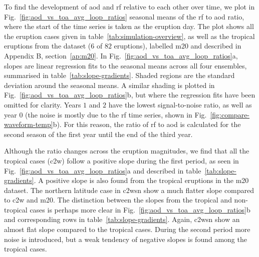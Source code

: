 \documentclass{ametsocV6.1}
\begin{document}
To find the development of \gls{aod} and \gls{rf} relative to each other over time, we
plot in Fig.~\ref{fig:aod_vs_toa_avg_loop_ratios} seasonal means of the \gls{rf} to
\gls{aod} ratio, where the start of the time series is taken as the eruption day. The
plot shows all the eruption cases given in table~\ref{tab:simulation-overview}, as well
as the tropical eruptions from the \citet{marshall2020dataset} dataset (\(6\) of \(82\)
eruptions), labelled \gls{m20} and described in Appendix B, section~\ref{ap:m20}. In
Fig.~\ref{fig:aod_vs_toa_avg_loop_ratios}a, slopes are linear regression fits to the
seasonal means across all four ensembles, summarised in table~\ref{tab:slope-gradients}.
Shaded regions are the standard deviation around the seasonal means. A similar shading
is plotted in Fig.~\ref{fig:aod_vs_toa_avg_loop_ratios}b, but where the regression fits
have been omitted for clarity. Years \(1\) and \(2\) have the lowest signal-to-noise
ratio, as well as year \(0\) (the noise is mostly due to the \gls{rf} time series, shown
in Fig.~\ref{fig:compare-waveform-temp}b). For this reason, the ratio of \gls{rf} to
\gls{aod} is calculated for the second season of the first year until the end of the
third year.

Although the ratio changes across the eruption magnitudes, we find that all the tropical
cases (\gls{c2w}) follow a positive slope during the first period, as seen in
Fig.~\ref{fig:aod_vs_toa_avg_loop_ratios}a and described in
table~\ref{tab:slope-gradients}. A positive slope is also found from the tropical
eruptions in the \gls{m20} dataset. The northern latitude case in \gls{c2wsn} show a
much flatter slope compared to \gls{c2w} and \gls{m20}. The distinction between the
slopes from the tropical and non-tropical cases is perhaps more clear in
Fig.~\ref{fig:aod_vs_toa_avg_loop_ratios}b and corresponding rows in
table~\ref{tab:slope-gradients}. Again, \gls{c2wsn} show an almost flat slope compared
to the tropical cases. During the second period more noise is introduced, but a weak
tendency of negative slopes is found among the tropical cases.
\end{document}
